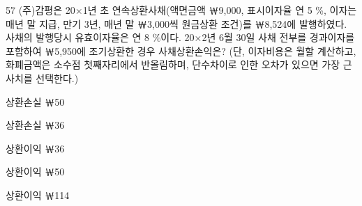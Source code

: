 \begin{question}{57}
(주)감평은 20×1년 초 연속상환사채(액면금액 ￦9,000, 표시이자율 연 5 \%, 이자는 매년 말 지급, 만기 3년, 매년 말 ￦3,000씩 원금상환 조건)를 ￦8,524에 발행하였다. 사채의 발행당시 유효이자율은 연 8 \%이다. 20×2년 6월 30일 사채 전부를 경과이자를 포함하여 ￦5,950에 조기상환한 경우 사채상환손익은? (단, 이자비용은 월할 계산하고, 화폐금액은 소수점 첫째자리에서 반올림하며, 단수차이로 인한 오차가 있으면 가장 근사치를 선택한다.)
\begin{choices}
  \item 상환손실 ￦50
  \item 상환손실 ￦36
  \item 상환이익 ￦36
  \item 상환이익 ￦50
  \item 상환이익 ￦114
\end{choices}
\end{question}
